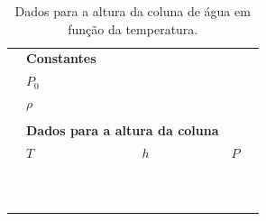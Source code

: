 \begin{table}[!htb]
\caption{Dados para a altura da coluna de água em função da temperatura.}
\label{Tab:DadosZeroAbsoluto}
	\begin{center}
		\begin{tabular}{cp{45mm}p{45mm}p{45mm}c}
		\toprule
		&\multicolumn{2}{l}{\textbf{Constantes}}\\
		\cmidrule{2-3}
		& \cellcolor[gray]{0.89} $P_0$ &\cellcolor[gray]{0.92} \\
		& \cellcolor[gray]{0.95} $\rho$ & \cellcolor[gray]{0.97}\\
		\cmidrule{2-3}
		\\
		&\multicolumn{2}{l}{\textbf{Dados para a altura da coluna}} \\
		\cmidrule{2-4}
		& $T$ & $h$ & $P$ & \\
		\cmidrule{2-4}
		& \cellcolor[gray]{0.89} & \cellcolor[gray]{0.92} & \cellcolor[gray]{0.89} \\
		& \cellcolor[gray]{0.95} & \cellcolor[gray]{0.97} & \cellcolor[gray]{0.95} \\
		& \cellcolor[gray]{0.89} & \cellcolor[gray]{0.92} & \cellcolor[gray]{0.89} \\
		& \cellcolor[gray]{0.95} & \cellcolor[gray]{0.97} & \cellcolor[gray]{0.95} \\
		& \cellcolor[gray]{0.89} & \cellcolor[gray]{0.92} & \cellcolor[gray]{0.89} \\
		& \cellcolor[gray]{0.95} & \cellcolor[gray]{0.97} & \cellcolor[gray]{0.95} \\
		& \cellcolor[gray]{0.89} & \cellcolor[gray]{0.92} & \cellcolor[gray]{0.89} \\
		& \cellcolor[gray]{0.95} & \cellcolor[gray]{0.97} & \cellcolor[gray]{0.95} \\
		& \cellcolor[gray]{0.89} & \cellcolor[gray]{0.92} & \cellcolor[gray]{0.89} \\
		& \cellcolor[gray]{0.95} & \cellcolor[gray]{0.97} & \cellcolor[gray]{0.95} \\
		\cmidrule{2-4}
		\bottomrule
		\end{tabular}
	\end{center}
\end{table}

